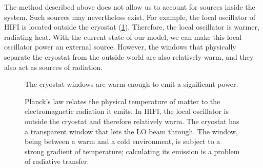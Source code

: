 The method described above does not allow us to account for sources inside the system.
Such sources may nevertheless exist.
For example, the local oscillator of HIFI is located outside the cryostat (\cref{fig:internal_sources_windows}).
Therefore, the local oscillator is warmer, radiating heat.
With the current state of our model, we can make this local oscillator power an external source.
However, the windows that physically separate the cryostat from the outside world are also relatively warm, and they also act as sources of radiation.

\begin{figure}
    \centering
    
    \caption{The cryostat windows are warm enough to emit a significant power.}
    \caption*{
        Planck's law relates the physical temperature of matter to the electromagnetic radiation it emits.
        In HIFI, the local oscillator is outside the cryostat and therefore relatively warm.
        The cryostat has a transparent window that lets the LO beam through.%
        The window, being between a warm and a cold environment, is subject to a strong gradient of temperature; calculating its emission is a problem of radiative transfer.}
    \label{fig:internal_sources_windows} 
\end{figure}

